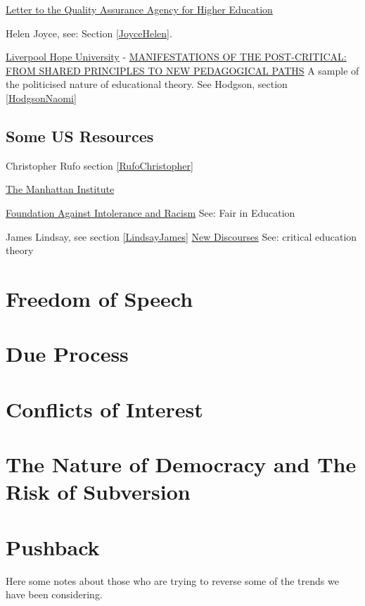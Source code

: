 \documentclass[10pt,titlepage]{book}
\begin{document}
\href{https://dontdivideus.com/articles/6391e51af3a56800082404c0/ddu-letter-to-the-quality-assurance-agency-for-higher-education
}{Letter to the Quality Assurance Agency for Higher Education}

Helen Joyce, see: Section \ref{JoyceHelen}.

\href{https://hira.hope.ac.uk}{Liverpool Hope University} - 
\href{https://hira.hope.ac.uk/id/eprint/3175/1/Hodgson%20et%20al%20%282020%29.pdf}{MANIFESTATIONS OF THE POST-CRITICAL: FROM SHARED PRINCIPLES TO NEW PEDAGOGICAL PATHS}
  A sample of the politicised nature of educational theory.
  See Hodgson, section \ref{HodgsonNaomi}

\subsection{Some US Resources}
Christopher Rufo section \ref{RufoChristopher}

\href{https://www.manhattan-institute.org}{The Manhattan Institute}

\href{https://www.fairforall.org}{Foundation Against Intolerance and Racism}
See: Fair in Education

James Lindsay, see section \ref{LindsayJames}
\href{https://newdiscourses.com}{New Discourses}
See:  critical education theory

\section{Freedom of Speech}

\section{Due Process}

\section{Conflicts of Interest}

\section{The Nature of Democracy and The Risk of Subversion}

\section{Pushback}

Here some notes about those who are trying to reverse some of the  trends we have been considering.
\end{document}

